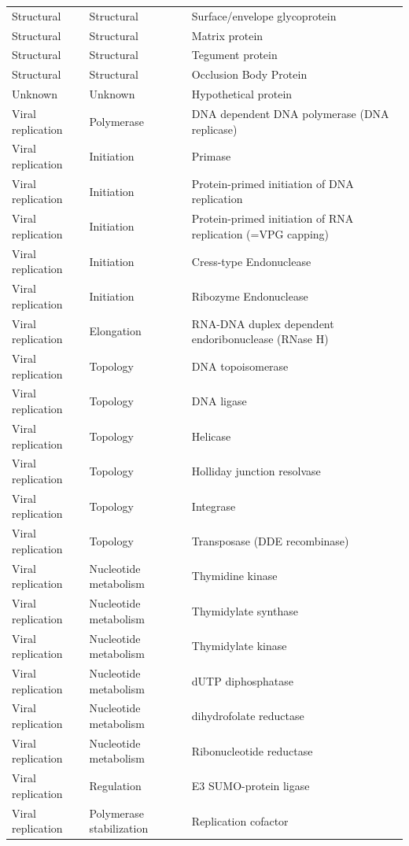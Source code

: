 \documentclass[
  sn-nature,
]{sn-jnl}
\begin{document}
\begin{longtable}{lll}
Structural & Structural & Surface/envelope glycoprotein\\
Structural & Structural & Matrix protein\\
Structural & Structural & Tegument protein\\
Structural & Structural & Occlusion Body Protein\\
Unknown & Unknown & Hypothetical protein\\
Viral replication & Polymerase & DNA dependent DNA polymerase (DNA replicase)\\
Viral replication & Initiation & Primase\\
Viral replication & Initiation & Protein-primed initiation of DNA replication\\
Viral replication & Initiation & Protein-primed initiation of RNA replication (=VPG capping)\\
Viral replication & Initiation & Cress-type Endonuclease\\
Viral replication & Initiation & Ribozyme Endonuclease\\
Viral replication & Elongation & RNA-DNA duplex dependent endoribonuclease (RNase H)\\
Viral replication & Topology & DNA topoisomerase\\
Viral replication & Topology & DNA ligase\\
Viral replication & Topology & Helicase\\
Viral replication & Topology & Holliday junction resolvase\\
Viral replication & Topology & Integrase\\
Viral replication & Topology & Transposase (DDE recombinase)\\
Viral replication & Nucleotide metabolism & Thymidine kinase\\
Viral replication & Nucleotide metabolism & Thymidylate synthase\\
Viral replication & Nucleotide metabolism & Thymidylate kinase\\
Viral replication & Nucleotide metabolism & dUTP diphosphatase\\
Viral replication & Nucleotide metabolism & dihydrofolate reductase\\
Viral replication & Nucleotide metabolism & Ribonucleotide reductase\\
Viral replication & Regulation & E3 SUMO-protein ligase\\
Viral replication & Polymerase stabilization & Replication cofactor\\

\end{longtable}
\end{document}
